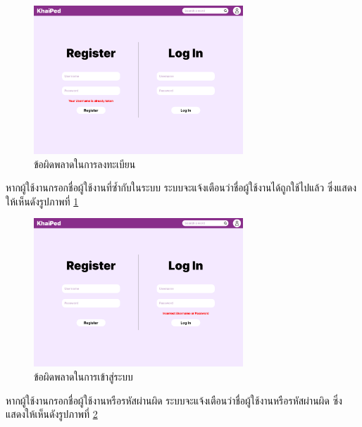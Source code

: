 \documentclass[12pt,oneside,openright,a4paper]{cpe-thai-project}
\begin{document}
\pagebreak
\begin{figure}[!h]\centering
	\includegraphics[width=0.7\textwidth, keepaspectratio=true]{image/chap3/ui/login/Home page - Register error.png}
	\caption{ข้อผิดพลาดในการลงทะเบียน}\label{fig:UI_RegisterError}
\end{figure}
\hspace{1cm}
หากผู้ใช้งานกรอกชื่อผู้ใช้งานที่ซ้ำกับในระบบ ระบบจะแจ้งเตือนว่าชื่อผู้ใช้งานได้ถูกใช้ไปแล้ว ซึ่งแสดงให้เห็นดังรูปภาพที่ \ref{fig:UI_RegisterError}

\begin{figure}[!h]\centering
	\includegraphics[width=0.7\textwidth, keepaspectratio=true]{image/chap3/ui/login/Home page - Log in error.png}
	\caption{ข้อผิดพลาดในการเข้าสู่ระบบ}\label{fig:UI_LogInError}
\end{figure}
\hspace{1cm}
หากผู้ใช้งานกรอกชื่อผู้ใช้งานหรือรหัสผ่านผิด ระบบจะแจ้งเตือนว่าชื่อผู้ใช้งานหรือรหัสผ่านผิด ซึ่งแสดงให้เห็นดังรูปภาพที่ \ref{fig:UI_LogInError}
\end{document}
